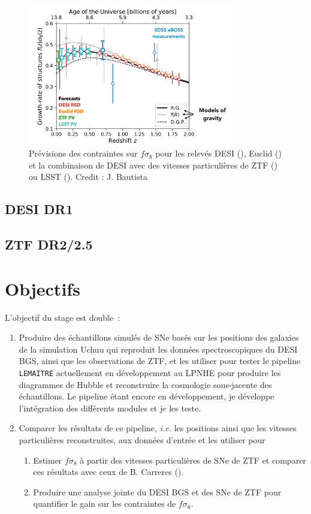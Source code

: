 \documentclass{book}
\def\lemaitre{\texttt{LEMAITRE}\xspace}
\begin{document}
\begin{figure}
    \centering
    \includegraphics[width=0.8\textwidth]{figures/fs8.png}
    \caption{Prévisions des contraintes sur $f\sigma_8$ pour les relevés DESI (\cite{hahn_desi_2023}), Euclid (\cite{euclid_collaboration_euclid_2024}) et la combinaison de DESI avec des vitesses particulières de ZTF (\cite{carreres_growth-rate_2023}) ou LSST (\cite{howlett_2mtf_2017}). Credit : J. Bautista}
    \label{fig:fs8}
\end{figure}

\subsection{DESI DR1}

\subsection{ZTF DR2/2.5}


\section{Objectifs}

L'objectif du stage est double~:
\begin{enumerate}
    \item Produire des échantillons simulés de SNe basés sur les positions des galaxies de la simulation Uchuu qui reproduit les données spectroscopiques du DESI BGS, ainsi que les observations de ZTF, et les utiliser pour tester le pipeline \lemaitre actuellement en développement au LPNHE pour produire les diagrammes de Hubble et reconstruire la cosmologie sous-jacente des échantillons. Le pipeline étant encore en développement, je développe l'intégration des différents modules et je les teste.
    \item Comparer les résultats de ce pipeline, \textit{i.e.} les positions ainsi que les vitesses particulières reconstruites, aux données d'entrée et les utiliser pour
    	\begin{enumerate}
		\item Estimer $f \sigma_8$ à partir des vitesses particulières de SNe de ZTF et comparer ces résultats avec ceux de B. Carreres (\cite{carreres_growth-rate_2023}).
		\item Produire une analyse jointe du DESI BGS et des SNe de ZTF pour quantifier le gain sur les contraintes de $f\sigma_8$.
	\end{enumerate}
\end{enumerate}
\end{document}
